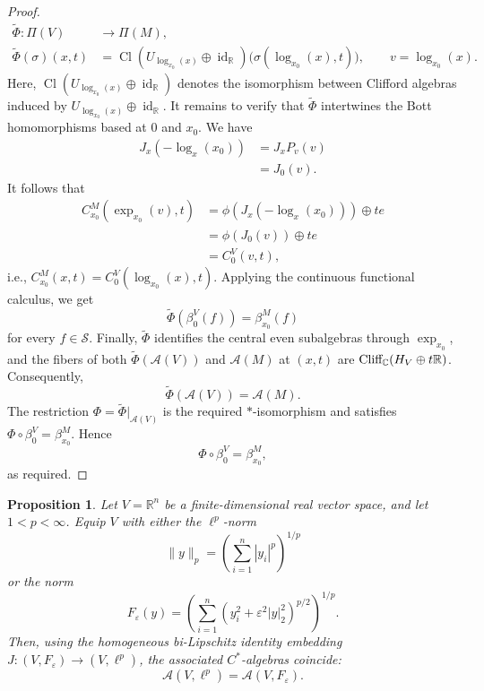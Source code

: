 \documentclass{article}
\theoremstyle{plain}
\newtheorem{proposition}[theorem]{Proposition}
\theoremstyle{definition}
\theoremstyle{remark}
\def\IC{\mathbb C}
\def\Cl{\textup{Cliff}_{\IC}}
\begin{document}
\begin{proof}
		\[
		\begin{split}
			\widetilde{\Phi}:\Pi(V)&\longrightarrow \Pi(M),\\
			\widetilde{\Phi}(\sigma)(x,t)
			&=
			\operatorname{Cl}(U_{\log_{x_0}(x)}\oplus\operatorname{id}_{\mathbb R})
			\big(\sigma(\log_{x_0}(x),t)\big),
			\qquad v=\log_{x_0}(x).
		\end{split}
		\]
		Here, $\operatorname{Cl}(U_{\log_{x_0}(x)}\oplus\operatorname{id}_{\mathbb R})$ denotes the isomorphism between Clifford algebras induced by $U_{\log_{x_0}(x)}\oplus\operatorname{id}_{\mathbb R}$. It remains to verify that $\widetilde{\Phi}$ intertwines the Bott homomorphisms based at $0$ and $x_0$. We have
		\[
		\begin{split}
			J_x(-\log_x(x_0))
			&=J_xP_v(v)\\
			&=J_0(v).
		\end{split}
		\]
		It follows that
		\[
		\begin{split}
			C_{x_0}^M(\exp_{x_0}(v),t)
			&=\phi(J_x(-\log_x(x_0)))\oplus te\\
			&=\phi(J_0(v))\oplus te\\
			&=C_0^V(v,t),
		\end{split}
		\]
		i.e., $C_{x_0}^M(x,t)=C_0^V(\log_{x_0}(x),t)$.
		Applying the continuous functional calculus, we get
		\[
		\widetilde{\Phi}(\beta_0^V(f))
		=\beta_{x_0}^M(f)
		\]
		for every $f\in\mathcal S$.
		Finally, $\widetilde\Phi$ identifies the central even subalgebras through $\exp_{x_0}$, and the fibers of both $\widetilde\Phi(\mathcal A(V))$ and $\mathcal A(M)$ at $(x,t)$ are $\Cl(H_V\oplus t\mathbb R)$.
		Consequently,
		$$
		\widetilde\Phi(\mathcal A(V))=\mathcal A(M).
		$$
		The restriction $\Phi=\widetilde\Phi|_{\mathcal A(V)}$ is the required $*$-isomorphism and satisfies $\Phi\circ\beta_0^V=\beta_{x_0}^M$. Hence
		\[
		\Phi\circ\beta_0^V=\beta_{x_0}^M,
		\]
		as required.
	\end{proof}
	\begin{proposition}
		Let $V=\mathbb{R}^n$ be a finite-dimensional real vector space, and let $1< p<\infty$. Equip $V$ with either the $\ell^p$-norm
		\[
		\|y\|_p=\left(\sum_{i=1}^n |y_i|^p\right)^{1/p}
		\]
		or the norm
		\[
		F_\varepsilon(y)=
		\left(
		\sum_{i=1}^n
		(y_i^2+\varepsilon^2|y|_2^2)^{p/2}
		\right)^{1/p}.
		\]
		Then, using the homogeneous bi-Lipschitz identity embedding $J: (V,F_{\varepsilon}) \to (V,\ell^p)$, the associated $C^*$-algebras coincide:
		\[
		\mathcal A(V,\ell^p)=\mathcal A(V,F_\varepsilon).
		\]
	\end{proposition}
	
\end{document}
